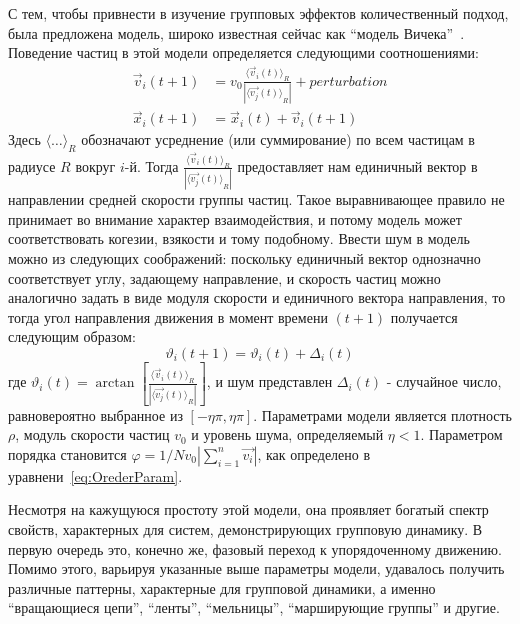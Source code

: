     С тем, чтобы привнести в изучение групповых эффектов количественный подход, была предложена модель, широко известная сейчас как ``модель Вичека''~\cite{vicsek1995}. Поведение частиц в этой модели определяется следующими соотношениями:
    \begin{align}
    \label{eq:ViksecEquationsOfMotion}
        \vec{v}_i(t+1) &= v_0 \frac{{\langle \vec{v}_i(t) \rangle}_R}{|{\langle \vec{v_j}(t) \rangle}_R|} + perturbation \\
        \vec{x}_i(t+1) &= \vec{x}_i(t)+\vec{v}_i(t+1)
    \end{align}
    Здесь ${\langle \dots \rangle}_R$ обозначают усреднение (или суммирование) по всем частицам в радиусе $R$ вокруг $i$-й. Тогда $ \frac{{\langle \vec{v}_i(t) \rangle}_R}{|{\langle \vec{v_j}(t) \rangle}_R|}$ предоставляет нам единичный вектор в направлении средней скорости группы частиц. Такое выравнивающее правило не принимает во внимание характер взаимодействия, и потому модель может соответствовать когезии, взякости и тому подобному. Ввести шум в модель можно из следующих соображений: поскольку единичный вектор однозначно соответствует углу, задающему направление, и скорость частиц можно аналогично задать в виде модуля скорости и единичного вектора направления, то тогда угол направления движения в момент времени $(t+1)$ получается следующим образом:
    \begin{equation}
        \vartheta_i (t+1) = \vartheta_i(t) + \Delta_i(t)
    \end{equation}
    где $\vartheta_i(t) = \arctan [{\frac{{\langle \vec{v}_i(t) \rangle}_R}{|{\langle \vec{v_j}(t) \rangle}_R|}}]$, и шум представлен $\Delta_i(t)$ - случайное число, равновероятно выбранное из $[-\eta \pi,\eta \pi]$. Параметрами модели является плотность $\rho$, модуль скорости частиц $v_0$ и уровень шума, определяемый $\eta < 1$. Параметром порядка становится 
    $\varphi = 1/{N v_0} |{\sum\limits_{i=1}^n \vec{v_i}}|$, как определено в уравнени~\ref{eq:OrederParam}.

    Несмотря на кажущуюся простоту этой модели, она проявляет богатый спектр свойств, характерных для систем, демонстрирующих групповую динамику. В первую очередь это, конечно же, фазовый переход к упорядоченному движению. Помимо этого, варьируя указанные выше параметры модели, удавалось получить различные паттерны, характерные для групповой динамики, а именно ``вращающиеся цепи'', ``ленты'', ``мельницы'', ``марширующие группы'' и другие.

